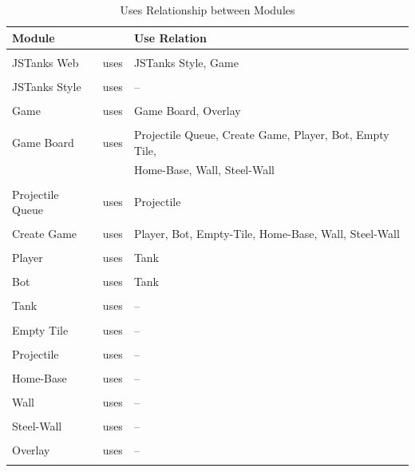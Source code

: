 \documentclass{article}
\begin{document}
\begin{table}[!h]
\begin{tabular}{lll}
Module && Use Relation \\ 
\hline \\
JSTanks Web&uses&JSTanks Style, Game\\ \\
JSTanks Style&uses&--\\ \\
Game&uses&Game Board, Overlay\\ \\
Game Board&uses&Projectile Queue, Create Game, Player, Bot, Empty Tile,\\
&& Home-Base, Wall, Steel-Wall	 \\ \\
Projectile Queue&uses&Projectile\\ \\
Create Game&uses&Player, Bot, Empty-Tile, Home-Base, Wall, Steel-Wall\\ \\
Player&uses&Tank\\ \\
Bot&uses&Tank\\ \\
Tank&uses&--\\ \\
Empty Tile&uses&--\\ \\
Projectile&uses&--\\ \\
Home-Base&uses&--\\ \\
Wall&uses&--\\ \\
Steel-Wall&uses&--\\ \\
Overlay&uses&--\\ \\
\hline
\end{tabular}
\caption {Uses Relationship between Modules}
\end{table}

\newpage
\listoftables
\listoffigures
\end{document}
